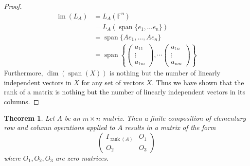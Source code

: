 \documentclass[oneside, 12pt]{book}
\DeclareMathOperator{\rank}{rank}
\DeclareMathOperator{\spn}{span}
\DeclareMathOperator{\im}{im}
\newtheorem{thm}{Theorem}[section]
\theoremstyle{definition}
\begin{document}
\begin{proof}
  \begin{align}
    \im(L_{A}) &= L_{A}(\mathbb{F}^{n}) \\
               &= L_{A}(\spn{\{e_{1}, \dots e_{n}\}}) \\
               &= \spn{\{Ae_{1}, \dots, Ae_{n}\}} \\
    &=
        \spn{ \left \{
          \begin{pmatrix} a_{11} \\ \vdots \\ a_{1m}\end{pmatrix}, \cdots \begin{pmatrix} a_{1n}\\ \vdots \\ a_{mn} \end{pmatrix}
        \right \}
        }
  \end{align}
  Furthermore, $\dim(\spn{(X)})$ is nothing but the number of linearly independent vectors in $X$ for any set of vectors $X$. Thus we have shown
  that the rank of a matrix is nothing but the number of linearly independent vectors in its columns.
\end{proof}
\begin{thm}
\label{thm_rrefrnk}
Let $A$ be an $m \times n$ matrix. Then a finite composition of elementary row and column operations applied to $A$ results in a matrix
of the form
\[ \begin{pmatrix}
     I_{\rank(A)} & O_{1} \\
     O_{2} & O_{3}
   \end{pmatrix}
 \]
 where $O_{1}, O_{2}, O_{3}$ are zero matrices.
\end{thm}
\end{document}
